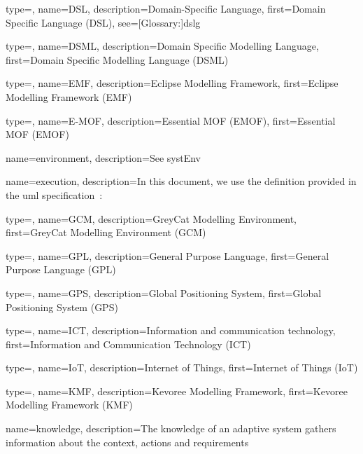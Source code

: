 {
	type=\acronymtype,
	name={DSL},
	description={Domain-Specific Language},
	first={Domain Specific Language (DSL)},
	see=[Glossary:]{dslg}
}

{
	type=\acronymtype,
	name={DSML},
	description={Domain Specific Modelling Language},
	first={Domain Specific Modelling Language (DSML)}
}

{
	type=\acronymtype,
	name={EMF},
	description={Eclipse Modelling Framework},
	first={Eclipse Modelling Framework (EMF)}
}

{
	type=\acronymtype,
	name={E-MOF},
	description={Essential MOF (EMOF)},
	first={Essential MOF (EMOF)}
}

{
	name={envi\-ron\-ment},
	description={See \gls{systEnv}}
}

{
	name={exe\-cu\-tion},
	description={In this document, we use the definition provided in the \gls{uml} specification~\cite{omg2017umlspec}: }
}

{
	type=\acronymtype,
	name={GCM},
	description={GreyCat Modelling Environment},
	first={GreyCat Modelling Environment (GCM)}
}

{
	type=\acronymtype,
	name={GPL},
	description={General Purpose Language},
	first={General Purpose Language (GPL)}
}

{
	type=\acronymtype,
	name={GPS},
	description={Global Positioning System},
	first={Global Positioning System (GPS)}
}

{
	type=\acronymtype,
	name={ICT},
	description={Information and communication technology},
	first={Information and Communication Technology (ICT)}
}

{
	type=\acronymtype,
	name={IoT},
	description={Internet of Things},
	first={Internet of Things (IoT)}
}

{
	type=\acronymtype,
	name={KMF},
	description={Kevoree Modelling Framework},
	first={Kevoree Modelling Framework (KMF)}
}

{
	name={knowl\-ed\-ge},
	description={The knowledge of an adaptive system gathers information about the \gls{context}, \glspl{action} and \glspl{requirement}}
}

